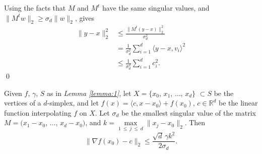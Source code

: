 \documentclass[smallextended,final]{svjour3}  %
\begin{document}
\begin{proofdot}
  Using the facts that $M$ and $M^t$ have the same singular values,
  and $\|M^tw\|_2 \geq \sigma_d \|w\|_2$, gives
  \begin{align*}
    \|y - x\|_2^2 &\leq \frac{\|M^t (y - x)\|_2^2}{\sigma_d^2} \\
                  &=    \frac{1}{\sigma_d^2} \sum_{i=1}^d \langle y - x, v_i \rangle^2 \\
                  &\leq \frac{1}{\sigma_d^2} \sum_{i=1}^d c_i^2.
  \end{align*}
  \qed
\end{proofdot}


\begin{plainlemma}
  \label{lemma:3}
  Given $f$, $\gamma$, $S$ as in {\it Lemma \ref{lemma:1}}, let $X =
  \{x_0$, $x_1$, $\ldots$, $x_d\}$ $\subset S$ be the vertices of a
  $d$-simplex, and let $\hat f(x) = \langle c, x - x_0 \rangle +
  f(x_0)$, $c \in \mathbb{R}^d$ be the linear function interpolating
  $f$ on $X.$ Let $\sigma_d$ be the smallest singular value of the
  matrix $M = (x_1 - x_0$, $\ldots$, $x_d - x_0)$, and $k =
  \max\limits_{1\ \leq\ j\ \leq\ d} \|x_j - x_0\|_2.$ Then
  $$\big\|\nabla f(x_0) - c\big\|_2 \leq \frac{\sqrt{d} \, \gamma k^2}{2 \sigma_d}.$$
\end{plainlemma}
\end{document}
